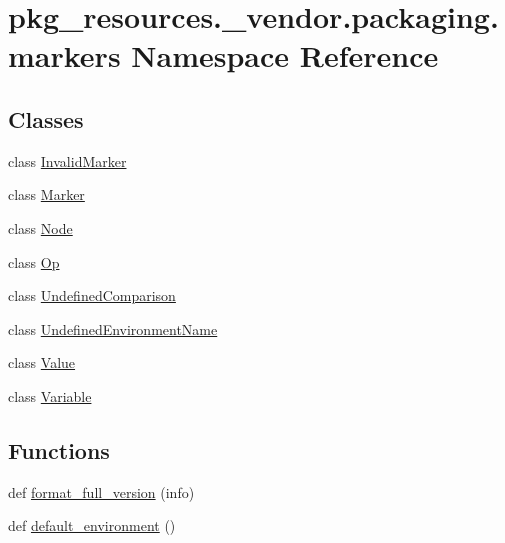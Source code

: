 \hypertarget{namespacepkg__resources_1_1__vendor_1_1packaging_1_1markers}{}\section{pkg\+\_\+resources.\+\_\+vendor.\+packaging.\+markers Namespace Reference}
\label{namespacepkg__resources_1_1__vendor_1_1packaging_1_1markers}
\subsection*{Classes}
\begin{DoxyCompactItemize}
\item 
class \hyperlink{classpkg__resources_1_1__vendor_1_1packaging_1_1markers_1_1_invalid_marker}{Invalid\+Marker}
\item 
class \hyperlink{classpkg__resources_1_1__vendor_1_1packaging_1_1markers_1_1_marker}{Marker}
\item 
class \hyperlink{classpkg__resources_1_1__vendor_1_1packaging_1_1markers_1_1_node}{Node}
\item 
class \hyperlink{classpkg__resources_1_1__vendor_1_1packaging_1_1markers_1_1_op}{Op}
\item 
class \hyperlink{classpkg__resources_1_1__vendor_1_1packaging_1_1markers_1_1_undefined_comparison}{Undefined\+Comparison}
\item 
class \hyperlink{classpkg__resources_1_1__vendor_1_1packaging_1_1markers_1_1_undefined_environment_name}{Undefined\+Environment\+Name}
\item 
class \hyperlink{classpkg__resources_1_1__vendor_1_1packaging_1_1markers_1_1_value}{Value}
\item 
class \hyperlink{classpkg__resources_1_1__vendor_1_1packaging_1_1markers_1_1_variable}{Variable}
\end{DoxyCompactItemize}
\subsection*{Functions}
\begin{DoxyCompactItemize}
\item 
def \hyperlink{namespacepkg__resources_1_1__vendor_1_1packaging_1_1markers_a97b11c652ee4b6598521e90bcad4f0e2}{format\+\_\+full\+\_\+version} (info)
\item 
def \hyperlink{namespacepkg__resources_1_1__vendor_1_1packaging_1_1markers_a3d0e91d534c7c8368d344f6be36538df}{default\+\_\+environment} ()
\end{DoxyCompactItemize}
